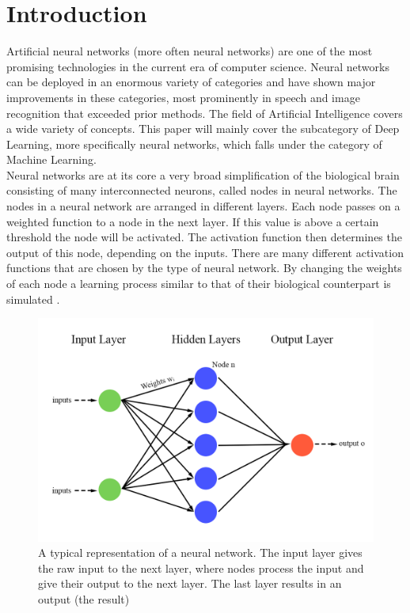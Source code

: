 \documentclass[conference]{IEEEtran}
\begin{document}
	\section{Introduction}
	Artificial neural networks (more often neural networks) are one of the most promising technologies in the current era of computer science. Neural networks can be deployed in an enormous variety of categories and have shown major improvements in these categories, most prominently in speech and image recognition \cite{speech_recognition1} that exceeded prior methods. The field of Artificial Intelligence covers a wide variety of concepts. This paper will mainly cover the subcategory of Deep Learning, more specifically neural networks, which falls under the category of Machine Learning. 
	\\
	Neural networks are at its core a very broad simplification of the biological brain consisting of many interconnected neurons, called nodes in neural networks. The nodes in a neural network are   arranged in different layers. Each node passes on a weighted function to a node in the next layer. If this value is above a certain threshold the node will be activated. The activation function then determines the output of this node, depending on the inputs. There are many different activation functions that are chosen by the type of neural network. By changing the weights of each node a learning process similar to that of their biological counterpart is simulated \cite{nn_basics}.
	\begin{figure}[h]
		\caption{A typical representation of a neural network. The input layer gives the raw input to the next layer, where nodes process the input and give their output to the next layer. The last layer results in an output (the result)}
		\centering
		\includegraphics[width=\linewidth]{pictures/neuralnetwork.png}
	\end{figure}
\end{document}
